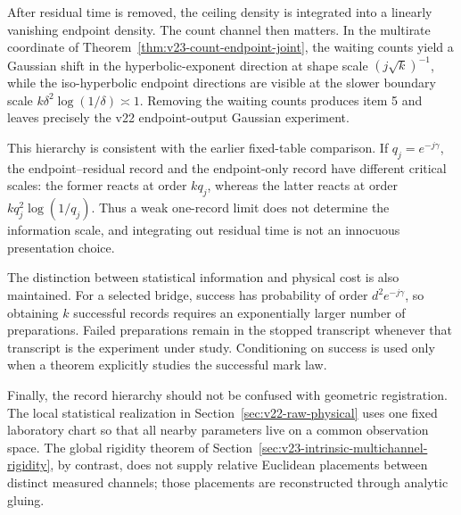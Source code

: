 After residual time is removed, the ceiling density is integrated into a
linearly vanishing endpoint density.  The count channel then matters.  In the
multirate coordinate of Theorem~\ref{thm:v23-count-endpoint-joint}, the waiting
counts yield a Gaussian shift in the hyperbolic-exponent direction at shape
scale \((j\sqrt k)^{-1}\), while the iso-hyperbolic endpoint directions are
visible at the slower boundary scale
\(k\delta^2\log(1/\delta)\asymp1\).  Removing the waiting counts produces item
5 and leaves precisely the v22 endpoint-output Gaussian experiment.

This hierarchy is consistent with the earlier fixed-table comparison.  If
\(q_j=e^{-j\gamma}\), the endpoint--residual record and the endpoint-only
record have different critical scales: the former reacts at order \(kq_j\),
whereas the latter reacts at order
\(kq_j^2\log(1/q_j)\).  Thus a weak one-record limit does not determine the
information scale, and integrating out residual time is not an innocuous
presentation choice.

The distinction between statistical information and physical cost is also
maintained.  For a selected bridge, success has probability of order
\(d^2e^{-j\gamma}\), so obtaining \(k\) successful records requires an
exponentially larger number of preparations.  Failed preparations remain in
the stopped transcript whenever that transcript is the experiment under
study.  Conditioning on success is used only when a theorem explicitly
studies the successful mark law.

Finally, the record hierarchy should not be confused with geometric
registration.  The local statistical realization in
Section~\ref{sec:v22-raw-physical} uses one fixed laboratory chart so that all
nearby parameters live on a common observation space.  The global rigidity
theorem of Section~\ref{sec:v23-intrinsic-multichannel-rigidity}, by contrast,
does not supply relative Euclidean placements between distinct measured
channels; those placements are reconstructed through analytic gluing.
